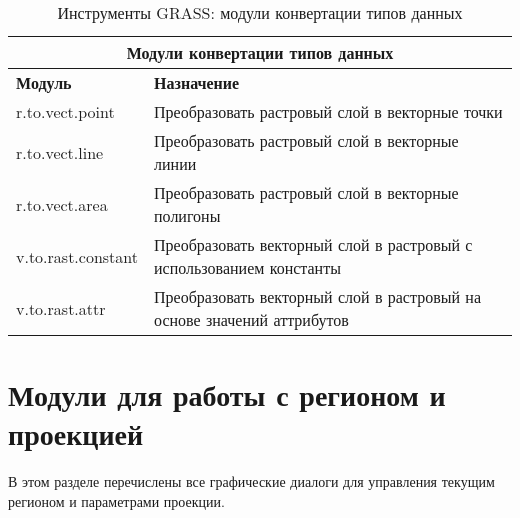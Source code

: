 {\renewcommand{\arraystretch}{0.7}
\begin{table}[H]
\centering
 \begin{tabular}{|p{4cm}|p{10cm}|}
  \hline \multicolumn{2}{|c|}{\textbf{Модули конвертации типов данных}} \\
  \hline \textbf{Модуль} & \textbf{Назначение} \\
  \hline r.to.vect.point & Преобразовать растровый слой в векторные точки \\
  \hline r.to.vect.line & Преобразовать растровый слой в векторные линии \\
  \hline r.to.vect.area & Преобразовать растровый слой в векторные полигоны \\
  \hline v.to.rast.constant & Преобразовать векторный слой в растровый
  с использованием константы \\
  \hline v.to.rast.attr & Преобразовать векторный слой в растровый на
  основе значений аттрибутов \\
\hline
\end{tabular}
 \caption{Инструменты GRASS: модули конвертации типов данных}
\end{table}}


\section{Модули для работы с регионом и проекцией}

В этом разделе перечислены все графические диалоги для управления
текущим регионом и параметрами проекции.

